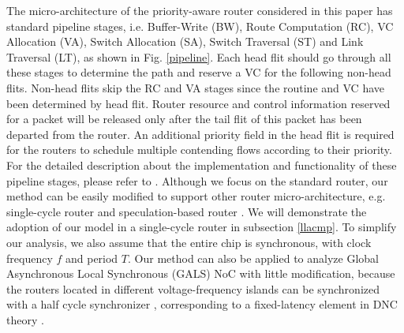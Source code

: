 \documentclass[preprint]{elsarticle}
\begin{document}
The micro-architecture of the priority-aware router considered in this paper has standard pipeline stages, i.e. Buffer-Write (BW), Route Computation (RC), VC Allocation (VA), Switch Allocation (SA), Switch Traversal (ST) and Link Traversal (LT), as shown in Fig. \ref{pipeline}. Each head flit should go through all these stages to determine the path and reserve a VC for the following non-head flits. Non-head flits skip the RC and VA stages since the routine and VC have been determined by head flit. Router resource and control information reserved for a packet will be released only after the tail flit of this packet has been departed from the router. An additional priority field in the head flit is required for the routers to schedule multiple contending flows according to their priority. For the detailed description about the implementation and functionality of these pipeline stages, please refer to \cite{jerger2009chip}. Although we focus on the standard router, our method can be easily modified to support other router micro-architecture, e.g. single-cycle router \cite{627905}\cite{Shi:2008:RCA:1397757.1397996}\cite{707545}\cite{73} and speculation-based router \cite{jerger2009chip}. We will demonstrate the adoption of our model in a single-cycle router in subsection \ref{llacmp}.  To simplify our analysis, we also assume that the entire chip is synchronous, with clock frequency $f$ and period $T$. Our method can also be applied to analyze Global Asynchronous Local Synchronous (GALS) NoC with little modification, because the routers located in different voltage-frequency islands can be synchronized with a half cycle synchronizer \cite{5476986}, corresponding to a fixed-latency element in DNC theory \cite{Boudec2001Network}.
\end{document}
